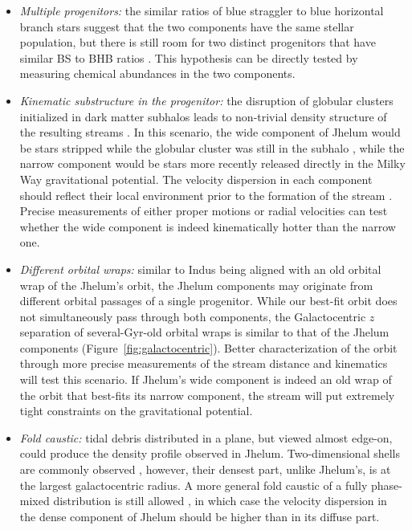 \documentclass[twocolumn]{aastex62}
\begin{document}
\begin{itemize}
 \item{\emph{Multiple progenitors:} the similar ratios of blue straggler to blue horizontal branch stars suggest that the two components have the same stellar population, but there is still room for two distinct progenitors that have similar BS to BHB ratios \citep[e.g., a low-mass globular cluster and a low-mass dwarf galaxy,][]{deason2015}.
 This hypothesis can be directly tested by measuring chemical abundances in the two components.
 }
 \item{\emph{Kinematic substructure in the progenitor:} the disruption of globular clusters initialized in dark matter subhalos leads to non-trivial density structure of the resulting streams \citep[e.g.,][]{penarrubia2017, carlberg2018}.
 In this scenario, the wide component of Jhelum would be stars stripped while the globular cluster was still in the subhalo \citep[similar to the recently reported GD-1 cocoon,][]{malhan2019}, while the narrow component would be stars more recently released directly in the Milky Way gravitational potential.
 The velocity dispersion in each component should reflect their local environment prior to the formation of the stream \citep[e.g.,][]{fardal2015}.
 Precise measurements of either proper motions or radial velocities can test whether the wide component is indeed kinematically hotter than the narrow one.
 }
 \item{\emph{Different orbital wraps:} similar to Indus being aligned with an old orbital wrap of the Jhelum's orbit, the Jhelum components may originate from different orbital passages of a single progenitor.
 While our best-fit orbit does not simultaneously pass through both components, the Galactocentric $z$ separation of several-Gyr-old orbital wraps is similar to that of the Jhelum components (Figure~\ref{fig:galactocentric}).
 Better characterization of the orbit through more precise measurements of the stream distance and kinematics will test this scenario.
 If Jhelum's wide component is indeed an old wrap of the orbit that best-fits its narrow component, the stream will put extremely tight constraints on the gravitational potential.
 }
 \item{\emph{Fold caustic:} tidal debris distributed in a plane, but viewed almost edge-on, could produce the density profile observed in Jhelum.
 Two-dimensional shells are commonly observed \citep[e.g.,][]{tal2009,kadofong2018}, however, their densest part, unlike Jhelum's, is at the largest galactocentric radius.
 A more general fold caustic of a fully phase-mixed distribution is still allowed \citep[e.g.,][]{tremaine1999}, in which case the velocity dispersion in the dense component of Jhelum should be higher than in its diffuse part.
}
\end{itemize}
\end{document}
